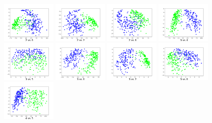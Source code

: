 \includegraphics[height=2cm]{./figs/2vs6.png}
\includegraphics[height=2cm]{./figs/2vs7.png}
\includegraphics[height=2cm]{./figs/2vs8.png}
\includegraphics[height=2cm]{./figs/3vs4.png}
\includegraphics[height=2cm]{./figs/3vs5.png}
\includegraphics[height=2cm]{./figs/3vs6.png}
\includegraphics[height=2cm]{./figs/3vs7.png}
\includegraphics[height=2cm]{./figs/3vs8.png}
\includegraphics[height=2cm]{./figs/4vs5.png}
